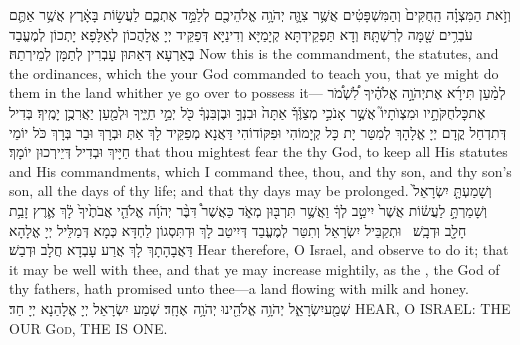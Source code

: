 \newperek
{}%
{וְזֹ֣את הַמִּצְוָ֗ה הַֽחֻקִּים֙ וְהַמִּשְׁפָּטִ֔ים אֲשֶׁ֥ר צִוָּ֛ה יְהֹוָ֥ה אֱלֹהֵיכֶ֖ם לְלַמֵּ֣ד אֶתְכֶ֑ם לַעֲשׂ֣וֹת בָּאָ֔רֶץ אֲשֶׁ֥ר אַתֶּ֛ם עֹבְרִ֥ים שָׁ֖מָּה לְרִשְׁתָּֽהּ׃}
{וְדָא תַּפְקֵידְתָּא קְיָמַיָּא וְדִינַיָּא דְּפַקֵּיד יְיָ אֱלָהֲכוֹן לְאַלָּפָא יָתְכוֹן לְמֶעֱבַד בְּאַרְעָא דְּאַתּוּן עָבְרִין לְתַמָּן לְמֵירְתַהּ׃}
{Now this is the commandment, the statutes, and the ordinances, which the \lord\space your God commanded to teach you, that ye might do them in the land whither ye go over to possess it—}{}
{לְמַ֨עַן תִּירָ֜א אֶת\maqqaf יְהֹוָ֣ה אֱלֹהֶ֗יךָ לִ֠שְׁמֹ֠ר אֶת\maqqaf כׇּל\maqqaf חֻקֹּתָ֣יו וּמִצְוֺתָיו֮ אֲשֶׁ֣ר אָנֹכִ֣י מְצַוֶּ֒ךָ֒ אַתָּה֙ וּבִנְךָ֣ וּבֶן\maqqaf בִּנְךָ֔ כֹּ֖ל יְמֵ֣י חַיֶּ֑יךָ וּלְמַ֖עַן יַאֲרִכֻ֥ן יָמֶֽיךָ׃}
{בְּדִיל דְּתִדְחַל קֳדָם יְיָ אֱלָהָךְ לְמִטַּר יָת כָּל קְיָמוֹהִי וּפִקּוֹדוֹהִי דַּאֲנָא מְפַקֵּיד לָךְ אַתְּ וּבְרָךְ וּבַר בְּרָךְ כֹּל יוֹמֵי חַיָּיךְ וּבְדִיל דְּיֵירְכוּן יוֹמָךְ׃}
{that thou mightest fear the \lord\space thy God, to keep all His statutes and His commandments, which I command thee, thou, and thy son, and thy son’s son, all the days of thy life; and that thy days may be prolonged.}{}
{וְשָׁמַעְתָּ֤ יִשְׂרָאֵל֙ וְשָׁמַרְתָּ֣ לַעֲשׂ֔וֹת אֲשֶׁר֙ יִיטַ֣ב לְךָ֔ וַאֲשֶׁ֥ר תִּרְבּ֖וּן מְאֹ֑ד כַּאֲשֶׁר֩ דִּבֶּ֨ר יְהֹוָ֜ה אֱלֹהֵ֤י אֲבֹתֶ֙יךָ֙ לָ֔ךְ אֶ֛רֶץ זָבַ֥ת חָלָ֖ב וּדְבָֽשׁ׃ \petucha }
{וּתְקַבֵּיל יִשְׂרָאֵל וְתִטַּר לְמֶעֱבַד דְּיִיטַב לָךְ וּדְתִּסְגוֹן לַחְדָּא כְּמָא דְּמַלֵּיל יְיָ אֱלָהָא דַּאֲבָהָתָךְ לָךְ אֲרַע עָבְדָא חֲלָב וּדְבַשׁ׃}
{Hear therefore, O Israel, and observe to do it; that it may be well with thee, and that ye may increase mightily, as the \lord, the God of thy fathers, hath promised unto thee—a land flowing with milk and honey.}{}
\newseder
{}%
{שְׁמַ֖\large ע\normalsize\space יִשְׂרָאֵ֑ל יְהֹוָ֥ה אֱלֹהֵ֖ינוּ יְהֹוָ֥ה \pasek  אֶחָֽ\large ד\normalsize ׃}
{שְׁמַע יִשְׂרָאֵל יְיָ אֱלָהַנָא יְיָ חַד׃}
{HEAR, O ISRAEL: THE \lord\space OUR \textsc{God}, THE \lord\space IS ONE.}{}
